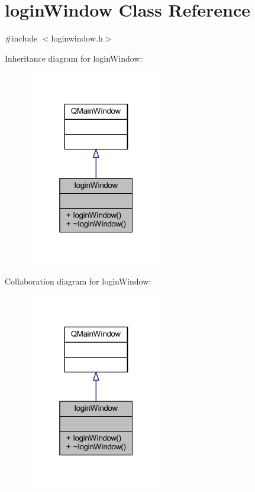 \hypertarget{classlogin_window}{}\section{login\+Window Class Reference}
\label{classlogin_window}


{\ttfamily \#include $<$loginwindow.\+h$>$}



Inheritance diagram for login\+Window\+:\nopagebreak
\begin{figure}[H]
\begin{center}
\leavevmode
\includegraphics[width=172pt]{classlogin_window__inherit__graph}
\end{center}
\end{figure}


Collaboration diagram for login\+Window\+:\nopagebreak
\begin{figure}[H]
\begin{center}
\leavevmode
\includegraphics[width=172pt]{classlogin_window__coll__graph}
\end{center}
\end{figure}
